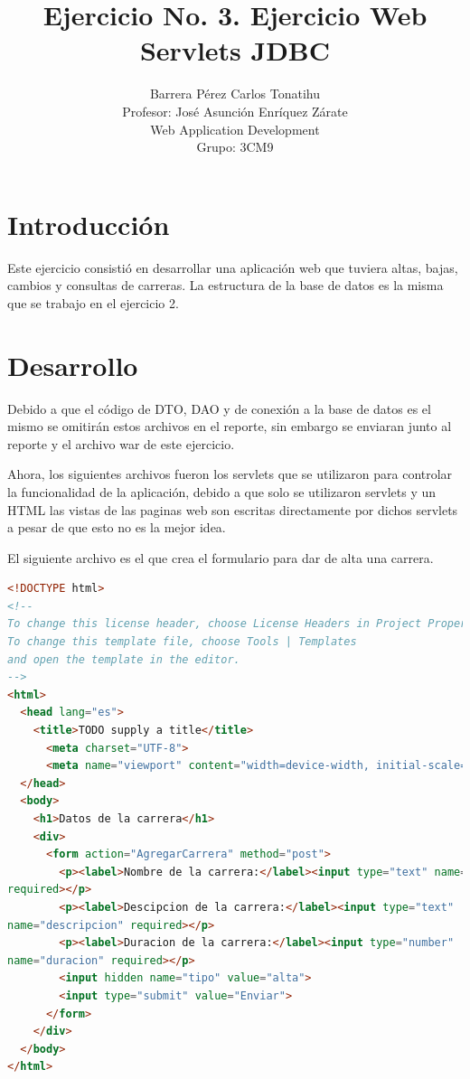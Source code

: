 \documentclass[a4paper,12pt]{article}
\title{Ejercicio No. 3. Ejercicio Web Servlets JDBC}
\author{Barrera Pérez Carlos Tonatihu \\ Profesor: José Asunción Enríquez 
Zárate \\ Web Application Development \\ Grupo: 3CM9 }
\begin{document}
\maketitle
\newpage
\tableofcontents
\newpage

\section{Introducción}
Este ejercicio consistió en desarrollar una aplicación web que tuviera altas, 
bajas, cambios y consultas de carreras. La estructura de la base de datos es la 
misma que se trabajo en el ejercicio 2.

\section{Desarrollo}
Debido a que el código de DTO, DAO y de conexión a la base de datos es el mismo 
se omitirán estos archivos en el reporte, sin embargo se enviaran junto al 
reporte y el archivo war de este ejercicio.

Ahora, los siguientes archivos fueron los servlets que se utilizaron para 
controlar la funcionalidad de la aplicación, debido a que solo se utilizaron 
servlets y un HTML las vistas de las paginas web son escritas directamente por 
dichos servlets a pesar de que esto no es la mejor idea.

El siguiente archivo es el que crea el formulario para dar de alta una carrera.

\begin{lstlisting}[language=HTML, style=customHTML, 
caption={index.html}, captionpos=b, basicstyle=\fontfamily{cmss}\small]
<!DOCTYPE html>
<!--
To change this license header, choose License Headers in Project Properties.
To change this template file, choose Tools | Templates
and open the template in the editor.
-->
<html>
  <head lang="es">
    <title>TODO supply a title</title>
      <meta charset="UTF-8">
      <meta name="viewport" content="width=device-width, initial-scale=1.0">
  </head>
  <body>
    <h1>Datos de la carrera</h1>
    <div>
      <form action="AgregarCarrera" method="post">
        <p><label>Nombre de la carrera:</label><input type="text" name="nombre" 
required></p>
        <p><label>Descipcion de la carrera:</label><input type="text" 
name="descripcion" required></p>
        <p><label>Duracion de la carrera:</label><input type="number" 
name="duracion" required></p>
        <input hidden name="tipo" value="alta">
        <input type="submit" value="Enviar">
      </form>
    </div>
  </body>
</html>
\end{lstlisting}
\end{document}
